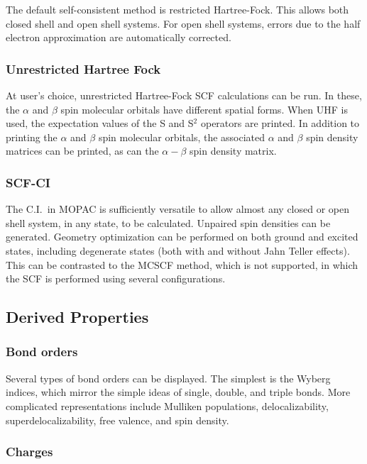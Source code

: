 The default self-consistent method is restricted Hartree-Fock.  This allows both
closed shell and open shell systems.  For open shell systems, errors due to the
half electron approximation are automatically corrected.

\subsubsection*{Unrestricted Hartree Fock}

At user's choice, unrestricted Hartree-Fock SCF calculations can be run.  In these,
the $\alpha$ and $\beta$  spin molecular orbitals have different spatial forms.
When UHF is
used, the expectation values of the S and S$^2$ operators are printed. In
addition to printing the $\alpha$ and $\beta$ spin molecular orbitals, the associated $\alpha$ and $\beta$
spin density matrices can be printed, as can the $\alpha - \beta$ spin
density matrix.

\subsubsection*{SCF-CI}

The C.I.\ in MOPAC is sufficiently versatile to allow almost any closed or open
shell system, in any state, to be calculated.  Unpaired spin densities can be
generated.  Geometry optimization can be performed on both ground and excited
states, including degenerate states (both with and without Jahn Teller
effects).   This can be contrasted to the MCSCF method, which is not supported,
in which  the SCF is performed using several configurations.

\subsection{Derived Properties}

\subsubsection*{Bond orders}

Several types of bond orders can be displayed.  The simplest is the Wyberg
indices, which mirror the simple ideas of single, double, and triple bonds.
More  complicated representations include Mulliken populations,
delocalizability,  superdelocalizability, free valence, and spin density.

\subsubsection*{Charges}

